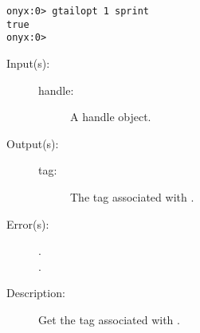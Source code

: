 \begin{description}
\begin{description}
\begin{verbatim}
onyx:0> gtailopt 1 sprint
true
onyx:0>
		\end{verbatim}
	\end{description}
\label{systemdict:handletag}
\item[{\onyxop{handle}{handletag}{tag}}: ]
	\begin{description}\item[]
	\item[Input(s): ]
		\begin{description}\item[]
		\item[handle: ]
			A handle object.
		\end{description}
	\item[Output(s): ]
		\begin{description}\item[]
		\item[tag: ]
			The tag associated with .
		\end{description}
	\item[Error(s): ]
		\begin{description}\item[]
		\item[.]
		\item[.]
		\end{description}
	\item[Description: ]
		Get the tag associated with .


\end{description}
\end{description}
